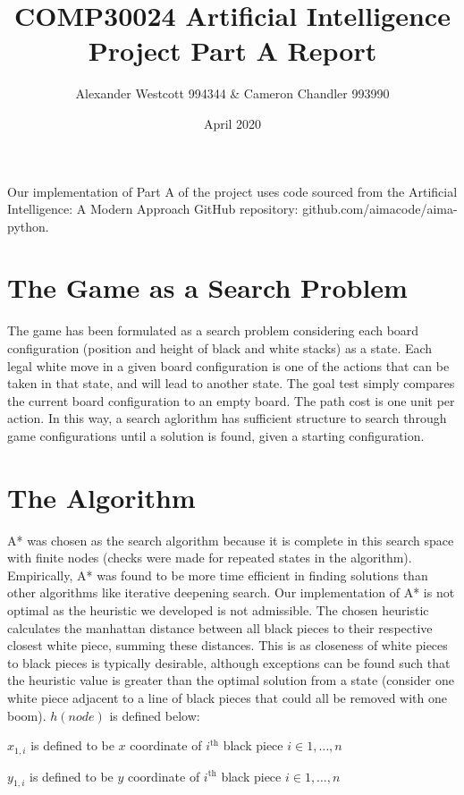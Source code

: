\documentclass[a4paper,11pt]{article}
\author{Alexander Westcott 994344 \& Cameron Chandler 993990}
\title{COMP30024 Artificial Intelligence Project Part A Report}
\date{April 2020}
\begin{document}
\maketitle

\noindent Our implementation of Part A of the project uses code sourced from the
Artificial Intelligence: A Modern Approach GitHub repository: github.com/aimacode/aima-python.

\section*{The Game as a Search Problem}

The game has been formulated as a search problem considering each board configuration 
(position and height of black and white stacks) as a state. 
Each legal white move in a given board configuration is one 
of the actions that can be taken in that state, and will lead to another state. 
The goal test simply compares the current board configuration to an empty board. 
The path cost is one unit per action. In this way, a search aglorithm has sufficient 
structure to search through game configurations until a solution is found, given a starting 
configuration. 

\section*{The Algorithm}
A* was chosen as the search algorithm because it is complete in this search space with 
finite nodes (checks were made for repeated states in the algorithm). 
Empirically, A* was found to be more time efficient in finding solutions than other algorithms like iterative deepening search. 
Our implementation of A* is not optimal as the heuristic we developed is not admissible. 
The chosen heuristic calculates the manhattan distance between all black pieces to their 
respective closest white piece, summing these distances. This is as closeness 
of white pieces to black pieces is typically desirable, although 
exceptions can be found such that the heuristic value is greater
than the optimal solution from a state (consider one white piece 
adjacent to a line of black pieces that could all be removed with one boom). 
$h(node)$ is defined below: \newline

$x_{1,i}$ is defined to be $x$ coordinate of $i^{\text{th}}$ black piece $i \in {1,\dots,n}$

$y_{1,i}$ is defined to be $y$ coordinate of $i^{\text{th}}$ black piece $i \in {1,\dots,n}$
\end{document}
